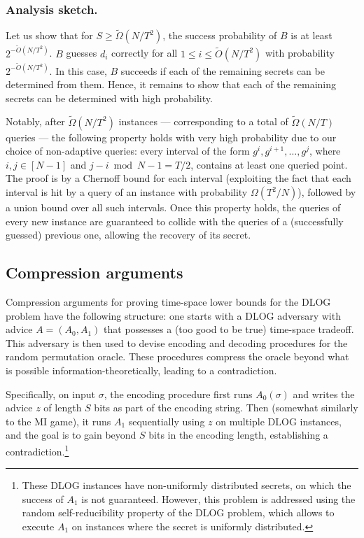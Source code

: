 \documentclass[11pt]{article}
\begin{document}
\subsubsection*{Analysis sketch.} 
Let us show that for $S \geq \tilde{\Omega}(N/T^2)$, the success probability of $B$ is at least $2^{-\tilde{O}(N/T^2)}$. $B$ guesses $d_i$ correctly for all $1 \le i \le \tilde{O}(N/T^2)$ with probability $2^{-\tilde{O}(N/T^2)}$. In this case, $B$ succeeds if each of the remaining secrets can be determined from them. Hence, it remains to show that each of the remaining secrets can be determined with high probability.

Notably, after $\tilde{\Omega}(N/T^2)$ instances --- corresponding to a total of $\tilde{\Omega}(N/T)$ queries --- the following property holds with very high probability due to our choice of non-adaptive queries: every interval of the form $g^{i},g^{i+1},\ldots,g^{j}$, where $i,j \in [N-1]$ and $j - i \bmod N - 1 = T/2$, contains at least one queried point. The proof is by a Chernoff bound for each interval (exploiting the fact that each interval is hit by a query of an instance with probability $\Omega(T^2/N)$), followed by a union bound over all such intervals. Once this property holds, the queries of every new instance are guaranteed to collide with the queries of a (successfully guessed) previous one, allowing the recovery of its secret. 

\subsection{Compression arguments}
Compression arguments for proving time-space lower bounds for the DLOG problem have the following structure: one starts with a DLOG adversary with advice $A = (A_0, A_1)$ that possesses a (too good to be true) time-space tradeoff. This adversary is then used to devise encoding and decoding procedures for the random permutation oracle. These procedures compress the oracle beyond what is possible information-theoretically, leading to a contradiction.

Specifically, on input $\sigma$, the encoding procedure first runs $A_0(\sigma)$
and writes the advice $z$ of length $S$ bits as part of the encoding string.
Then (somewhat similarly to the MI game), 
it runs $A_1$ sequentially using $z$ on multiple DLOG instances,
and the goal is to gain beyond $S$ bits in the encoding length, 
establishing a contradiction.\footnote{These DLOG instances have non-uniformly distributed secrets, on which the success of $A_1$ is not guaranteed. However, this problem is addressed using the random self-reducibility property of the DLOG problem, which allows to execute $A_1$ on instances where the secret is uniformly distributed.}
\end{document}
